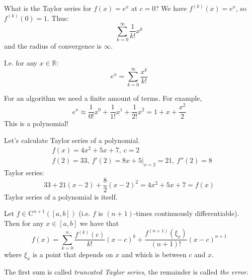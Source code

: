 \begin{example}[1]
    What is the Taylor series for $f(x) = e^x$ at $c = 0$?
    We have $f^{(k)}(x) = e^x$, so $f^{(k)}(0) = 1$.
    Thus: \[
        \sum_{k = 0}^{\infty} \frac{1}{k!} x^k
    \]
    and the radius of convergence is $\infty$.

    I.e. for any $x \in \mathbb{R}$:
    \[e^x = \sum_{k = 0}^{\infty} \frac{x^k}{k!}\]

    For an algorithm we need a finite amount of terms. For example,
    \[
        e^x \approx \frac{1}{0!} x^0 + \frac{1}{1!} x^1 + \frac{1}{2!} x^2 =
        1 + x + \frac{x^2}{2}
    \]
    This is a polynomial!
\end{example}

\begin{example}[2]
    Let's calculate Taylor series of a polynomial.
    \begin{align*}
        &
        f(x) = 4x^2 + 5x + 7,\ c = 2
        \\&
        f(2) = 33,\ f'(2) = 8x + 5\Big|_{x = 2} = 21,\ f''(2) = 8
    \end{align*}
    Taylor series:
    \[
        33 + 21(x - 2) + \frac{8}{2} (x - 2)^2 = 4x^2 + 5x + 7 = f(x)
    \]
    Taylor series of a polynomial is itself.
\end{example}

\begin{theorem}
    Let $f \in \mathrm{C}^{n + 1}([a, b])$ (i.e. $f$ is $(n+1)$-times
    continuously differentiable).
    Then for any $x \in [a, b]$ we have that 
    \[
        f(x) = \sum_{k=0}^n \frac{f^{(k)}(c)}{k!}(x - c)^k +
        \frac{f^{(n+1)}(\xi_x)}{(n+1)!} (x - c)^{n+1}
    \]
    where $\xi_x$ is a point that depends on $x$ and which is between $c$ and $x$.

    The first sum is called \textit{truncated Taylor series}, the remainder is called \textit{the error}.
\end{theorem}